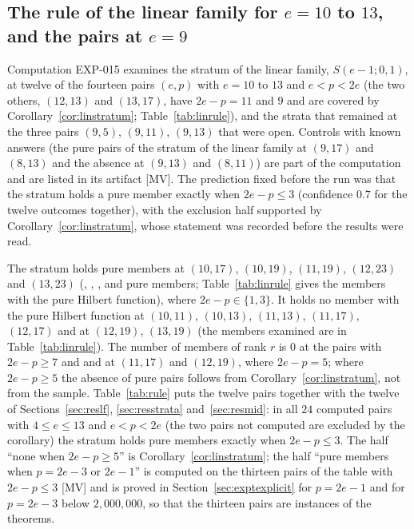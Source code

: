 \documentclass[11pt]{article}
\theoremstyle{definition}
\theoremstyle{remark}
\newcommand{\EXP}[1]{\mbox{EXP-#1}}
\begin{document}
\subsection{The rule of the linear family for \texorpdfstring{$e=10$ to $13$}{e=10 to 13}, and the pairs at \texorpdfstring{$e=9$}{e=9}}
\label{sec:reslinrule}

Computation \EXP{015} examines the stratum of the linear family, $S(e-1;0,1)$, at twelve of the fourteen pairs $(e,p)$ with $e=10$ to $13$ and $e<p<2e$ (the two others, $(12,13)$ and $(13,17)$, have $2e-p=11$ and $9$ and are covered by Corollary~\ref{cor:linstratum}; Table~\ref{tab:linrule}), and the strata that remained at the three pairs $(9,5)$, $(9,11)$, $(9,13)$ that were open. Controls with known answers (the pure pairs of the stratum of the linear family at $(9,17)$ and $(8,13)$ and the absence at $(9,13)$ and $(8,11)$) are part of the computation and are listed in its artifact [MV]. The prediction fixed before the run was that the stratum holds a pure member exactly when $2e-p\le3$ (confidence $0.7$ for the twelve outcomes together), with the exclusion half supported by Corollary~\ref{cor:linstratum}, whose statement was recorded before the results were read.

\begin{table}[htbp]
\centering\footnotesize

\caption{The stratum of the linear family at the twelve pairs $(e,p)$ with $e=10$ to $13$: $e$, $p$, $2e-p$, the number of members ($N$), the number examined, whether all members were taken, the enumeration was cut by the early stop or the members were sampled, the members of rank $r$, with the pure Hilbert function and with the pure Betti table.}
\label{tab:linrule}
\end{table}

The stratum holds pure members at $(10,17)$, $(10,19)$, $(11,19)$, $(12,23)$ and $(13,23)$ (\nlinrTenSeventeenPure, \nlinrTenNineteenPure, \nlinrElevenNineteenPure, \nlinrTwelveTwentyThreePure{} and \nlinrThirteenTwentyThreePure{} pure members; Table~\ref{tab:linrule} gives the members with the pure Hilbert function), where $2e-p\in\{1,3\}$. It holds no member with the pure Hilbert function at $(10,11)$, $(10,13)$, $(11,13)$, $(11,17)$, $(12,17)$ and at $(12,19)$, $(13,19)$ (the members examined are in Table~\ref{tab:linrule}). The number of members of rank $r$ is $0$ at the pairs with $2e-p\ge7$ and \nlinrElevenSeventeenRankR{} and \nlinrTwelveNineteenRankR{} at $(11,17)$ and $(12,19)$, where $2e-p=5$; where $2e-p\ge5$ the absence of pure pairs follows from Corollary~\ref{cor:linstratum}, not from the sample. Table~\ref{tab:rule} puts the twelve pairs together with the twelve of Sections~\ref{sec:reslf}, \ref{sec:resstrata} and~\ref{sec:resmid}: in all $24$ computed pairs with $4\le e\le13$ and $e<p<2e$ (the two pairs not computed are excluded by the corollary) the stratum holds pure members exactly when $2e-p\le3$. The half ``none when $2e-p\ge5$'' is Corollary~\ref{cor:linstratum}; the half ``pure members when $p=2e-3$ or $2e-1$'' is computed on the thirteen pairs of the table with $2e-p\le3$ [MV] and is proved in Section~\ref{sec:exptexplicit} for $p=2e-1$ and for $p=2e-3$ below $2{,}000{,}000$, so that the thirteen pairs are instances of the theorems.
\end{document}
